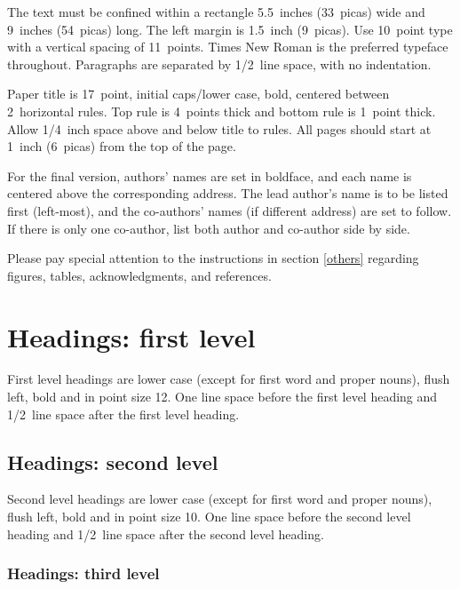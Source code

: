 \documentclass{article} %
\begin{document}
	The text must be confined within a rectangle 5.5~inches (33~picas) wide and
9~inches (54~picas) long. The left margin is 1.5~inch (9~picas).
Use 10~point type with a vertical spacing of 11~points. Times New Roman is the
preferred typeface throughout. Paragraphs are separated by 1/2~line space,
with no indentation.

Paper title is 17~point, initial caps/lower case, bold, centered between
2~horizontal rules. Top rule is 4~points thick and bottom rule is 1~point
thick. Allow 1/4~inch space above and below title to rules. All pages should
start at 1~inch (6~picas) from the top of the page.


For the final version, authors' names are
set in boldface, and each name is centered above the corresponding
address. The lead author's name is to be listed first (left-most), and
the co-authors' names (if different address) are set to follow. If
there is only one co-author, list both author and co-author side by side.

Please pay special attention to the instructions in section \ref{others}
regarding figures, tables, acknowledgments, and references.

\section{Headings: first level}
\label{headings}

First level headings are lower case (except for first word and proper nouns),
flush left, bold and in point size 12. One line space before the first level
heading and 1/2~line space after the first level heading.

\subsection{Headings: second level}

Second level headings are lower case (except for first word and proper nouns),
flush left, bold and in point size 10. One line space before the second level
heading and 1/2~line space after the second level heading.

\subsubsection{Headings: third level}
\end{document}
